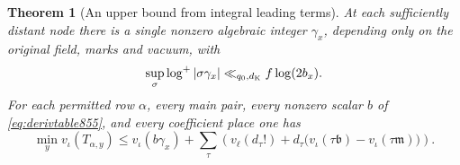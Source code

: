 \documentclass[a4paper,11pt]{article}
\newtheorem{theorem}[proposition]{Theorem}
\theoremstyle{definition}
\theoremstyle{remark}
\numberwithin{equation}{section}
\begin{document}
\begin{theorem}[An upper bound from integral leading terms]
\leavevmode\label{thm:integralleading857}
At each sufficiently distant node there is a single nonzero
algebraic integer \(\gamma_x\), depending only on the original
field, marks and vacuum, with
\[
    \sup_\sigma \log^+|\sigma\gamma_x|
                     \ll_{q_0,d_{\rm K}} f\log(2b_x).
\]
For each permitted row \(\alpha\), every main pair, every
nonzero scalar \(b\) of \eqref{eq:derivtable855}, and every
coefficient place one has
\begin{equation}
 \min_{y}v_\iota(T_{\alpha,y})\le
 v_\iota(b\gamma_x)+\sum_\tau
   \left(v_\ell(d_\tau!)
           +d_\tau\bigl(v_\iota(\tau\mathfrak b)
                         -v_\iota(\tau\mathfrak m)\bigr)\right).
 \label{eq:integralleading857}
\end{equation}
\end{theorem}
\end{document}
